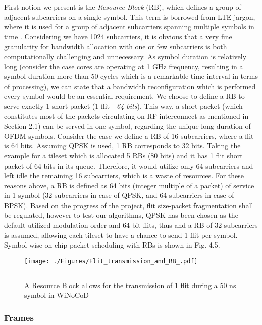 First notion we present is the \textit{Resource Block} (RB), which defines a group of adjacent subcarriers on a single symbol. This term is borrowed from LTE jargon, where it is used for a group of adjacent subcarriers spanning multiple symbols in time \cite{sesia2009lte}. Considering we have 1024 subcarriers, it is obvious that a very fine granularity for bandwidth allocation with one or few subcarriers is both computationally challenging and unnecessary. As symbol duration is relatively long (consider the case cores are operating at 1 GHz frequency, resulting in a symbol duration more than 50 cycles which is a remarkable time interval in terms of processing), we can state that a bandwidth reconfiguration which is performed every symbol would be an essential requirement. We choose to define a RB to serve exactly 1 short packet (1 flit - \textit{64 bits}). This way, a short packet (which constitutes most of the packets circulating on RF interconnect as mentioned in Section 2.1) can be served in one symbol, regarding the unique long duration of OFDM symbols. Consider the case we define a RB of 16 subcarriers, where a flit is 64 bits. Assuming QPSK is used, 1 RB corresponds to 32 bits. Taking the example for a tileset which is allocated 5 RBs (80 bits) and it has 1 flit short packet of 64 bits in its queue. Therefore, it would utilize only 64 subcarriers and left idle the remaining 16 subcarriers, which is a waste of resources. For these reasons above, a RB is defined as 64 bits (integer multiple of a packet) of service in 1 symbol (32 subcarriers in case of QPSK, and 64 subcarriers in case of BPSK). Based on the progress of the project, flit size-packet fragmentation shall be regulated, however to test our algorithms, QPSK has been chosen as the default utilized modulation order and 64-bit flits, thus and a RB of 32 subcarriers is assumed, allowing each tileset to have a chance to send 1 flit per symbol. Symbol-wise on-chip packet scheduling with RBs is shown in Fig. 4.5.

\begin{figure}[htbp]
  \centering
    \texttt{[image: ./Figures/Flit\_transmission\_and\_RB\_.pdf]}
    \rule{35em}{0.5pt}
  \caption[]{A Resource Block allows for the transmission of 1 flit during a 50 ns symbol in WiNoCoD} 
  \label{fig:FlitsAndRB}
\end{figure}



\subsubsection{Frames}


